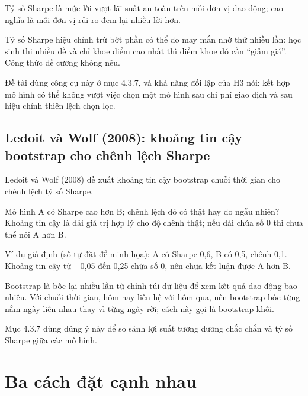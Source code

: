 Tỷ số Sharpe là mức lời vượt lãi suất an toàn trên mỗi đơn vị dao động; cao nghĩa là mỗi đơn vị rủi ro đem lại nhiều lời hơn.

Tỷ số Sharpe hiệu chỉnh trừ bớt phần có thể do may mắn nhờ thử nhiều lần: học sinh thi nhiều đề và chỉ khoe điểm cao nhất thì điểm khoe đó cần “giảm giá”. Công thức đề cương không nêu.

Đề tài dùng công cụ này ở mục 4.3.7, và khả năng đối lập của H3 nói: kết hợp mô hình có thể không vượt việc chọn một mô hình sau chi phí giao dịch và sau hiệu chỉnh thiên lệch chọn lọc.

\subsection{Ledoit và Wolf (2008): khoảng tin cậy bootstrap cho chênh lệch Sharpe}

Ledoit và Wolf (2008) đề xuất khoảng tin cậy bootstrap chuỗi thời gian cho chênh lệch tỷ số Sharpe.

Mô hình A có Sharpe cao hơn B; chênh lệch đó có thật hay do ngẫu nhiên? Khoảng tin cậy là dải giá trị hợp lý cho độ chênh thật; nếu dải chứa số 0 thì chưa thể nói A hơn B.

\begin{tcolorbox}[breakable]
Ví dụ giả định (số tự đặt để minh họa): A có Sharpe 0,6, B có 0,5, chênh 0,1. Khoảng tin cậy từ −0,05 đến 0,25 chứa số 0, nên chưa kết luận được A hơn B.
\end{tcolorbox}

Bootstrap là bốc lại nhiều lần từ chính túi dữ liệu để xem kết quả dao động bao nhiêu. Với chuỗi thời gian, hôm nay liên hệ với hôm qua, nên bootstrap bốc từng nắm ngày liền nhau thay vì từng ngày rời; cách này gọi là bootstrap khối.

Mục 4.3.7 dùng đúng ý này để so sánh lợi suất tương đương chắc chắn và tỷ số Sharpe giữa các mô hình.

\section{Ba cách đặt cạnh nhau}

